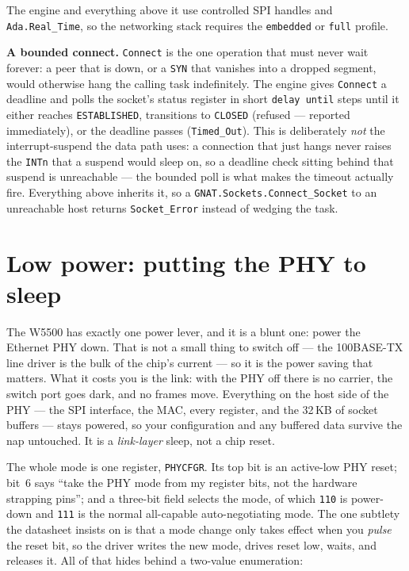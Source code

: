 The engine and everything above it use controlled SPI handles and
\texttt{Ada.Real\_Time}, so the networking stack requires the \texttt{embedded} or
\texttt{full} profile.

\textbf{A bounded connect.} \texttt{Connect} is the one operation that must never
wait forever: a peer that is down, or a \texttt{SYN} that vanishes into a dropped
segment, would otherwise hang the calling task indefinitely. The engine gives
\texttt{Connect} a deadline and polls the socket's status register in short
\texttt{delay until} steps until it either reaches \texttt{ESTABLISHED}, transitions
to \texttt{CLOSED} (refused --- reported immediately), or the deadline passes
(\texttt{Timed\_Out}). This is deliberately \emph{not} the interrupt-suspend the
data path uses: a connection that just hangs never raises the \texttt{INTn} that a
suspend would sleep on, so a deadline check sitting behind that suspend is
unreachable --- the bounded poll is what makes the timeout actually fire. Everything
above inherits it, so a \texttt{GNAT.Sockets.Connect\_Socket} to an unreachable host
returns \texttt{Socket\_Error} instead of wedging the task.

\section{Low power: putting the PHY to sleep}
\label{ch:net:lowpower}

The W5500 has exactly one power lever, and it is a blunt one: power the Ethernet
PHY down. That is not a small thing to switch off --- the 100BASE-TX line driver is the bulk
of the chip's current --- so it is the power saving that matters. What it costs you
is the link: with the PHY off there is no carrier, the switch port goes dark, and no
frames move. Everything on the host side of the PHY --- the SPI interface, the MAC,
every register, and the 32\,KB of socket buffers --- stays powered, so your
configuration and any buffered data survive the nap untouched. It is a
\emph{link-layer} sleep, not a chip reset.

The whole mode is one register, \texttt{PHYCFGR}. Its top bit is an active-low PHY
reset; bit~6 says ``take the PHY mode from my register bits, not the hardware
strapping pins''; and a three-bit field selects the mode, of which \texttt{110} is
power-down and \texttt{111} is the normal all-capable auto-negotiating mode. The one
subtlety the datasheet insists on is that a mode change only takes effect when you
\emph{pulse} the reset bit, so the driver writes the new mode, drives reset low,
waits, and releases it. All of that hides behind a two-value enumeration:

